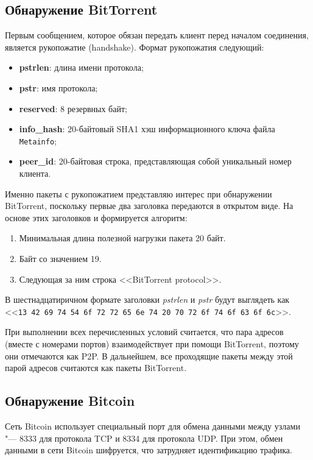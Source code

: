 \documentclass[bachelor, och, coursework]{SCWorks}
\begin{document}
\subsection{Обнаружение BitTorrent}
Первым сообщением, которое обязан передать клиент перед началом соединения, является рукопожатие (handshake).
Формат рукопожатия следующий:
\begin{itemize}
    \item \textbf{pstrlen}: длина имени протокола;
    \item \textbf{pstr}: имя протокола;
    \item \textbf{reserved}: 8 резервных байт;
    \item \textbf{info_hash}: 20-байтовый SHA1 хэш информационного ключа файла \\ \texttt{Metainfo};
    \item \textbf{peer_id}: 20-байтовая строка, представляющая собой уникальный номер клиента.
\end{itemize}

Именно пакеты с рукопожатием представляю интерес при обнаружении BitTorrent, поскольку первые два заголовка передаются в открытом виде. На основе этих заголовков и формируется алгоритм:
\begin{enumerate}
    \item Минимальная длина полезной нагрузки пакета 20 байт.
    \item Байт со значением 19.
    \item Следующая за ним строка <<BitTorrent protocol>>.
\end{enumerate}

В шестнадцатиричном формате заголовки \textit{pstrlen} и \textit{pstr} будут выглядеть как <<\texttt{13 42 69 74 54 6f 72 72 65 6e 74 20 70 72 6f 74 6f 63 6f 6c}>>.

При выполнении всех перечисленных условий считается, что пара адресов (вместе с номерами портов) взаимодействует при помощи BitTorrent, поэтому они отмечаются как P2P. В дальнейшем, все проходящие пакеты между этой парой адресов считаются как пакеты BitTorrent.

\subsection{Обнаружение Bitcoin}
Сеть Bitcoin использует специальный порт для обмена данными между узлами "--- 8333 для протокола TCP и 8334 для протокола UDP. При этом, обмен данными в сети Bitcoin шифруется, что затрудняет идентификацию трафика.
\end{document}
